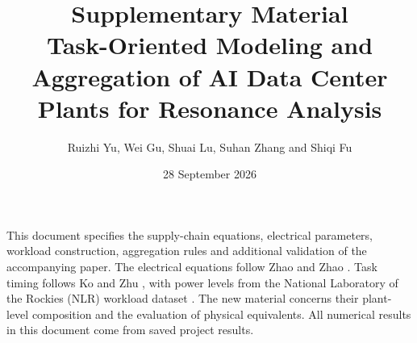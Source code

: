 \documentclass[11pt,a4paper]{article}
\numberwithin{equation}{section}
\begin{document}
\title{Supplementary Material\\[5pt]\large Task-Oriented Modeling and Aggregation of AI Data Center Plants for Resonance Analysis}
\author{Ruizhi Yu, Wei Gu, Shuai Lu, Suhan Zhang and Shiqi Fu}
\date{28 September 2026}
\maketitle
This document specifies the supply-chain equations, electrical parameters, workload construction, aggregation rules and additional validation of the accompanying paper.
The electrical equations follow Zhao and Zhao \cite{zhao2026dynamic}.
Task timing follows Ko and Zhu \cite{ko2026oscillations}, with power levels from the National Laboratory of the Rockies (NLR) workload dataset \cite{vercellino2026measurement}.
The new material concerns their plant-level composition and the evaluation of physical equivalents.
All numerical results in this document come from saved project results.
\tableofcontents






\end{document}
